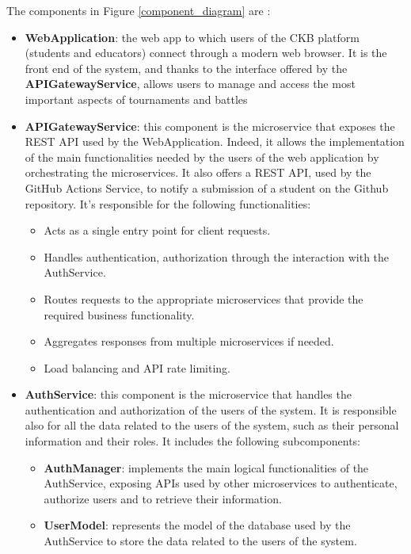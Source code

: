 \newpage
The components in Figure \ref{component_diagram} are :
\begin{itemize}
    \item \textbf{WebApplication}: the web app to which users of the CKB platform (students and educators) connect through a modern web browser. It is the front end of the system, and thanks to the interface offered by the \textbf{APIGatewayService}, allows users to manage and access the most important aspects of tournaments and battles
    \item \textbf{APIGatewayService}: this component is the microservice that exposes the REST API used by the WebApplication. Indeed, it allows the implementation of the main functionalities needed by the users of the web application by orchestrating the microservices. It also offers a REST API, used by the GitHub Actions Service, to notify a submission of a student on the Github repository.
    It's responsible for the following functionalities:
    \begin{itemize}
        \item Acts as a single entry point for client requests.
        \item Handles authentication, authorization through the interaction with the AuthService.
        \item Routes requests to the appropriate microservices that provide the required business functionality.
        \item Aggregates responses from multiple microservices if needed.
        \item Load balancing and API rate limiting.
    \end{itemize}
    \item \textbf{AuthService}: this component is the microservice that handles the authentication and authorization of the users of the system. It is responsible also for all the data related to the users of the system, such as their personal information and their roles. It includes the following subcomponents:
    \begin{itemize}
        \item \textbf{AuthManager}: implements the main logical functionalities of the AuthService, exposing APIs used by other microservices to authenticate, authorize users and to retrieve their information.
        \item \textbf{UserModel}: represents the model of the database used by the AuthService to store the data related to the users of the system.
    \end{itemize}

\end{itemize}
